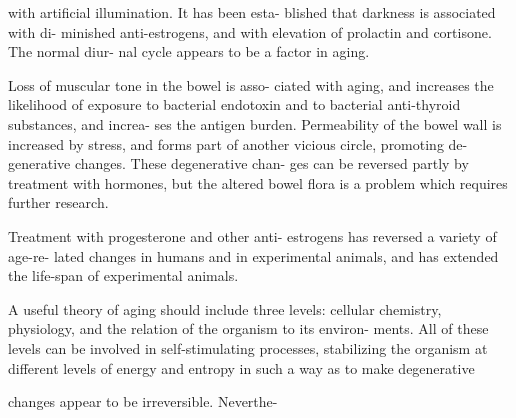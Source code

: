 \documentclass[10pt]{memoir}
\begin{document}
\begin{multicols}{2}

	\noindent with artificial illumination. It has been esta-\linebreak
	blished that darkness is associated with di-\linebreak
	minished anti-estrogens, and with elevation\linebreak
	of prolactin and cortisone. The normal diur-\linebreak
	nal cycle appears to be a factor in aging.

	\bigskip

	\noindent Loss of muscular tone in the bowel is asso-\linebreak
	ciated with aging, and increases the likelihood\linebreak
	of exposure to bacterial endotoxin and to\linebreak
	bacterial anti-thyroid substances, and increa-\linebreak
	ses the antigen burden. Permeability of the\linebreak
	bowel wall is increased by stress, and forms\linebreak
	part of another vicious circle, promoting de-\linebreak
	generative changes. These degenerative chan-\linebreak
	ges can be reversed partly by treatment with\linebreak
	hormones, but the altered bowel flora is a\linebreak
	problem which requires further research.

	\bigskip

	\noindent Treatment with progesterone and other anti-\linebreak
	estrogens has reversed a variety of age-re-\linebreak
	lated changes in humans and in experimental\linebreak
	animals, and has extended the life-span of\linebreak
	experimental animals.

	\bigskip

	\noindent A useful theory of aging should include three\linebreak
	levels: cellular chemistry, physiology, and\linebreak
	the relation of the organism to its environ-\linebreak
	ments. All of these levels can be involved\linebreak
	in self-stimulating processes, stabilizing the\linebreak
	organism at different levels of energy and\linebreak
	entropy in such a way as to make degenerative\linebreak
	{changes appear to be irreversible. Neverthe-\parfillskip=0pt\par}


\end{multicols}
\end{document}
